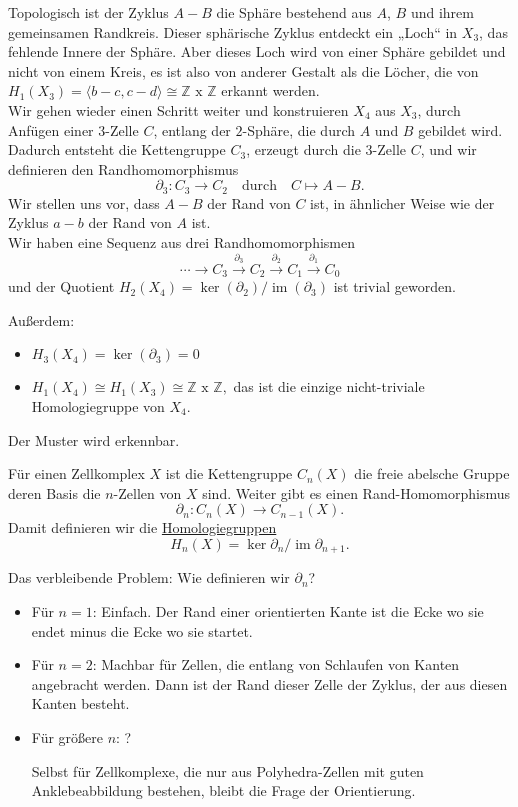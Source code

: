 \documentclass[fleqn, 12pt, letterpaper]{article}
\begin{document}
Topologisch ist der Zyklus \(A - B\) die Sphäre bestehend aus \(A\), \(B\) und ihrem gemeinsamen Randkreis.
Dieser sphärische Zyklus entdeckt ein „Loch“ in \(X_3\), das fehlende Innere der Sphäre. Aber dieses Loch wird von einer Sphäre gebildet und nicht von einem Kreis, es ist also von anderer Gestalt als die Löcher, die von \(H_1(X_3) =\langle b-c,c-d\rangle \cong \mathbb{Z}\text{ x }\mathbb{Z}\) erkannt werden.\\

Wir gehen wieder einen Schritt weiter und konstruieren \(X_4\) aus \(X_3\), durch Anfügen einer \(3\)-Zelle \(C\), entlang der \(2\)-Sphäre, die durch \(A\) und \(B\) gebildet wird. Dadurch entsteht die Kettengruppe \(C_3\), erzeugt durch die \(3\)-Zelle \(C\), und wir definieren den Randhomomorphismus
\[
\partial_3: C_3 \to C_2 \quad \text{durch} \quad C \mapsto A - B.
\]
Wir stellen uns vor, dass \(A - B\) der Rand von \(C\) ist, in ähnlicher Weise wie der Zyklus \(a - b\) der Rand von \(A\) ist.\\

Wir haben eine Sequenz aus drei Randhomomorphismen
\[
\cdots \to C_3 \xrightarrow{\partial_3} C_2 \xrightarrow{\partial_2} C_1 \xrightarrow{\partial_1} C_0 
\]
und der Quotient \(H_2(X_4) = \ker(\partial_2)/\operatorname{im}(\partial_3)\) ist trivial geworden.

Außerdem: 
\begin{itemize}
    \item \(H_3(X_4) = \ker(\partial_3) = 0\)
    \item \( H_1(X_4) \cong H_1(X_3) \cong \mathbb{Z}\text{ x }\mathbb{Z},\) das ist die einzige nicht-triviale Homologiegruppe von \(X_4\).
\end{itemize}

Der Muster wird erkennbar.

Für einen Zellkomplex \(X\) ist die Kettengruppe \(C_n(X)\) die freie abelsche Gruppe deren Basis die \(n\)-Zellen von \(X\) sind. Weiter gibt es einen Rand-Homomorphismus 
\[
\partial_n: C_n(X) \longrightarrow C_{n-1}(X).
\]
Damit definieren wir die \underline{Homologiegruppen} 
\[
H_n(X) = \ker \partial_n / \operatorname{im} \partial_{n+1}.
\]

Das verbleibende Problem: Wie definieren wir \(\partial_n\)?

\begin{itemize}
  \item Für \(n = 1\): Einfach. Der Rand einer orientierten Kante ist die Ecke wo sie endet minus die Ecke wo sie startet.
  
  \item Für \(n = 2\): Machbar für Zellen, die entlang von Schlaufen von Kanten angebracht werden. Dann ist der Rand dieser Zelle der Zyklus, der aus diesen Kanten besteht.

  \item Für größere \(n\): ?

  Selbst für Zellkomplexe, die nur aus Polyhedra-Zellen mit guten Anklebeabbildung bestehen, bleibt die Frage der Orientierung.
\end{itemize}
\end{document}
